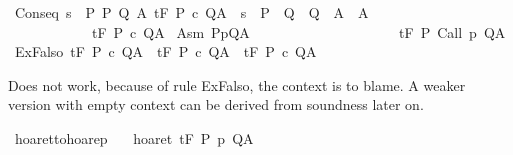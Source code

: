 \begin{isabellebody}
\isanewline
{\isacharbar}\ Conseq{\isacharcolon}\ {\isachardoublequoteopen}{\isasymforall}s\ {\isasymin}\ P{\isachardot}\ {\isasymexists}P{\isacharprime}\ Q{\isacharprime}\ A{\isacharprime}{\isachardot}\ {\isasymGamma}{\isacharcomma}{\isasymTheta}{\isasymturnstile}\isactrlsub t\isactrlbsub {\isacharslash}F\isactrlesub \ P{\isacharprime}\ c\ Q{\isacharprime}{\isacharcomma}A{\isacharprime}\ {\isasymand}\ s\ {\isasymin}\ P{\isacharprime}\ {\isasymand}\ Q{\isacharprime}\ {\isasymsubseteq}\ Q\ {\isasymand}\ A{\isacharprime}\ {\isasymsubseteq}\ A\ \isanewline
\ \ \ \ \ \ \ \ \ \ \ {\isasymLongrightarrow}\ {\isasymGamma}{\isacharcomma}{\isasymTheta}{\isasymturnstile}\isactrlsub t\isactrlbsub {\isacharslash}F\isactrlesub \ P\ c\ Q{\isacharcomma}A{\isachardoublequoteclose}\isanewline
\isanewline
\isanewline
{\isacharbar}\ Asm{\isacharcolon}\ {\isachardoublequoteopen}{\isacharparenleft}P{\isacharcomma}p{\isacharcomma}Q{\isacharcomma}A{\isacharparenright}\ {\isasymin}\ {\isasymTheta}\ \isanewline
\ \ \ \ \ \ \ \ {\isasymLongrightarrow}\ \isanewline
\ \ \ \ \ \ \ \ {\isasymGamma}{\isacharcomma}{\isasymTheta}{\isasymturnstile}\isactrlsub t\isactrlbsub {\isacharslash}F\isactrlesub \ P\ {\isacharparenleft}Call\ p{\isacharparenright}\ Q{\isacharcomma}A{\isachardoublequoteclose}\isanewline
\isanewline
{\isacharbar}\ ExFalso{\isacharcolon}\ {\isachardoublequoteopen}{\isasymlbrakk}{\isasymGamma}{\isacharcomma}{\isasymTheta}{\isasymTurnstile}\isactrlsub t\isactrlbsub {\isacharslash}F\isactrlesub \ P\ c\ Q{\isacharcomma}A{\isacharsemicolon}\ {\isasymnot}\ {\isasymGamma}{\isasymTurnstile}\isactrlsub t\isactrlbsub {\isacharslash}F\isactrlesub \ P\ c\ Q{\isacharcomma}A{\isasymrbrakk}\ {\isasymLongrightarrow}\ {\isasymGamma}{\isacharcomma}{\isasymTheta}{\isasymturnstile}\isactrlsub t\isactrlbsub {\isacharslash}F\isactrlesub \ P\ c\ Q{\isacharcomma}A{\isachardoublequoteclose}\isanewline
\ \ %
%
\begin{isamarkuptext}%
Does not work, because of rule ExFalso, the context \isa{{\isasymTheta}} is to blame.
 A weaker version with empty context can be derived from soundness 
 later on.%
\end{isamarkuptext}\isamarkuptrue%
\isamarkupfalse%
\ hoaret{\isacharunderscore}to{\isacharunderscore}hoarep{\isacharcolon}\isanewline
\ \ \ hoaret{\isacharcolon}\ {\isachardoublequoteopen}{\isasymGamma}{\isacharcomma}{\isasymTheta}{\isasymturnstile}\isactrlsub t\isactrlbsub {\isacharslash}F\isactrlesub \ P\ p\ Q{\isacharcomma}A{\isachardoublequoteclose}\isanewline

\end{isabellebody}

